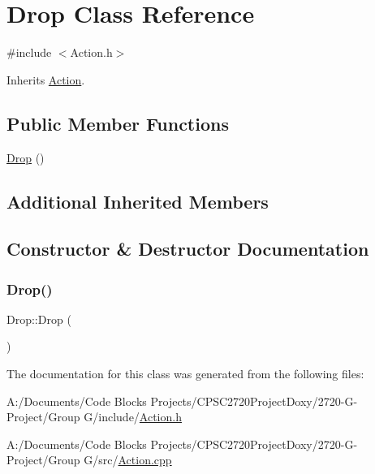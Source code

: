 \hypertarget{class_drop}{}\section{Drop Class Reference}
\label{class_drop}


{\ttfamily \#include $<$Action.\+h$>$}



Inherits \mbox{\hyperlink{class_action}{Action}}.

\subsection*{Public Member Functions}
\begin{DoxyCompactItemize}
\item 
\mbox{\hyperlink{class_drop_a769601040431442e1742798e7479926e}{Drop}} ()
\end{DoxyCompactItemize}
\subsection*{Additional Inherited Members}


\subsection{Constructor \& Destructor Documentation}
\mbox{\label{class_drop_a769601040431442e1742798e7479926e}} 
\subsubsection{\texorpdfstring{Drop()}{Drop()}}
{\footnotesize\ttfamily Drop\+::\+Drop (\begin{DoxyParamCaption}{ }\end{DoxyParamCaption})}



The documentation for this class was generated from the following files\+:\begin{DoxyCompactItemize}
\item 
A\+:/\+Documents/\+Code Blocks Projects/\+C\+P\+S\+C2720\+Project\+Doxy/2720-\/\+G-\/\+Project/\+Group G/include/\mbox{\hyperlink{_action_8h}{Action.\+h}}\item 
A\+:/\+Documents/\+Code Blocks Projects/\+C\+P\+S\+C2720\+Project\+Doxy/2720-\/\+G-\/\+Project/\+Group G/src/\mbox{\hyperlink{_action_8cpp}{Action.\+cpp}}\end{DoxyCompactItemize}

